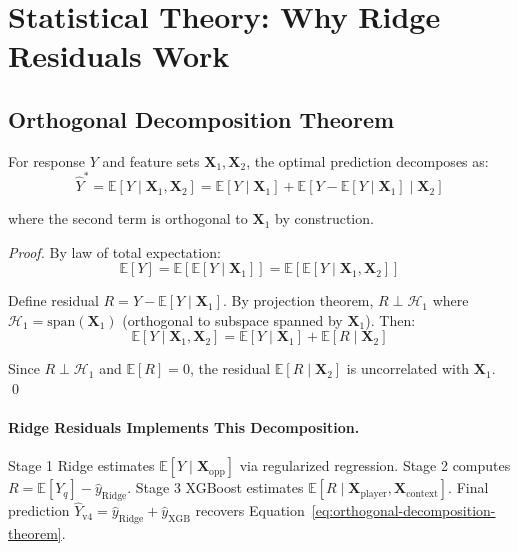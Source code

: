 \section{Statistical Theory: Why Ridge Residuals Work}
\label{sec:statistical-theory}

\subsection{Orthogonal Decomposition Theorem}

\begin{theorem}
For response $Y$ and feature sets $\mathbf{X}_1, \mathbf{X}_2$, the optimal prediction decomposes as:
\begin{equation}
\hat{Y}^* = \mathbb{E}[Y \mid \mathbf{X}_1, \mathbf{X}_2] = \mathbb{E}[Y \mid \mathbf{X}_1] + \mathbb{E}[Y - \mathbb{E}[Y \mid \mathbf{X}_1] \mid \mathbf{X}_2]
\label{eq:orthogonal-decomposition-theorem}
\end{equation}

\noindent where the second term is orthogonal to $\mathbf{X}_1$ by construction.
\end{theorem}

\begin{proof}
By law of total expectation:
\begin{equation}
\mathbb{E}[Y] = \mathbb{E}[\mathbb{E}[Y \mid \mathbf{X}_1]] = \mathbb{E}[\mathbb{E}[Y \mid \mathbf{X}_1, \mathbf{X}_2]]
\end{equation}

Define residual $R = Y - \mathbb{E}[Y \mid \mathbf{X}_1]$. By projection theorem, $R \perp \mathcal{H}_1$ where $\mathcal{H}_1 = \text{span}(\mathbf{X}_1)$ (orthogonal to subspace spanned by $\mathbf{X}_1$). Then:
\begin{equation}
\mathbb{E}[Y \mid \mathbf{X}_1, \mathbf{X}_2] = \mathbb{E}[Y \mid \mathbf{X}_1] + \mathbb{E}[R \mid \mathbf{X}_2]
\end{equation}

Since $R \perp \mathcal{H}_1$ and $\mathbb{E}[R] = 0$, the residual $\mathbb{E}[R \mid \mathbf{X}_2]$ is uncorrelated with $\mathbf{X}_1$. \qed
\end{proof}

\paragraph{Ridge Residuals Implements This Decomposition.}
Stage 1 Ridge estimates $\mathbb{E}[Y \mid \mathbf{X}_{\text{opp}}]$ via regularized regression. Stage 2 computes $R = \mathbb{E}[Y_q] - \hat{y}_{\text{Ridge}}$. Stage 3 XGBoost estimates $\mathbb{E}[R \mid \mathbf{X}_{\text{player}}, \mathbf{X}_{\text{context}}]$. Final prediction $\hat{Y}_{\text{v4}} = \hat{y}_{\text{Ridge}} + \hat{y}_{\text{XGB}}$ recovers Equation~\ref{eq:orthogonal-decomposition-theorem}.


